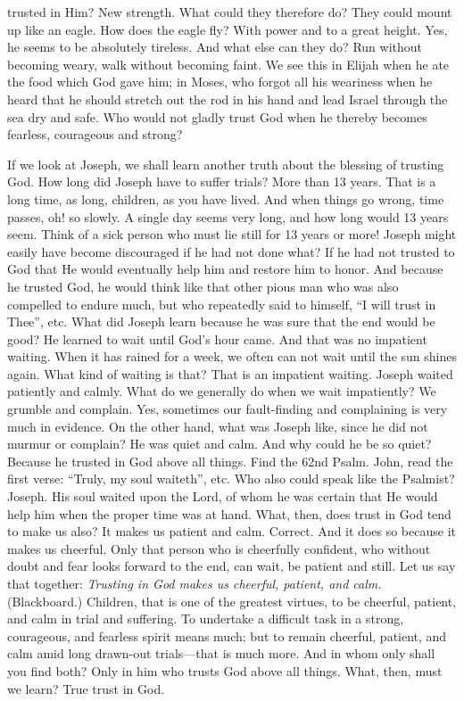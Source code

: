 trusted in Him? New strength. What could they therefore do? They could mount up like an eagle. How does the eagle fly? With power and to a great height. Yes, he seems to be absolutely tireless. And what else can they do? Run without becoming weary, walk without becoming
faint. We see this in Elijah when he ate the food which God gave him; in Moses, who forgot all his weariness when he heard that he should stretch out the rod in his hand and lead Israel through the sea dry and safe. Who would not gladly trust God when he thereby becomes fearless, courageous and strong?

If we look at Joseph, we shall learn another truth about the blessing of trusting God. How long did Joseph have to suffer trials? More than 13 years. That is a long time, as long, children, as you have lived. And when things go wrong, time passes, oh! so slowly. A single day seems very long, and how long would 13 years seem. Think of a sick person who must lie still for 13 years or more! Joseph might easily have become discouraged if he had not done what? If he had not trusted to God that He would eventually help him and restore him to honor. And because he trusted God, he would think like that other pious man who was also compelled to endure much, but who repeatedly said to himself, “I will trust in Thee”, etc. What did Joseph learn because he was sure that the end would be good? He learned to wait until God’s hour came. And that was no impatient waiting. When it has rained for a week, we often can not wait until the sun shines again. What kind of waiting is that? That is an impatient waiting. Joseph waited patiently and calmly. What do we generally do when we wait impatiently? We grumble and complain. Yes, sometimes our fault-finding and complaining is very much in evidence. On the other hand, what was Joseph like, since he did not murmur or complain? He was quiet and calm. And why could he be so quiet? Because he trusted in God above all things. Find the 62nd Psalm. John, read the first verse: “Truly, my soul waiteth”, etc. Who also could speak like the Psalmist? Joseph. His soul waited upon the Lord, of whom he was certain that He would help him when the proper time was at hand. What, then, does trust in God tend to make us also? It makes us patient and calm. Correct. And it does so because it makes us cheerful. Only that person who is cheerfully confident, who without doubt and fear looks forward to the end, can wait, be patient and still. Let us say that together: \emph{Trusting in God makes us cheerful, patient, and calm.} (Blackboard.) Children, that is one of the greatest virtues, to be cheerful, patient, and calm in trial and suffering. To undertake a difficult task in a strong, courageous, and fearless spirit means much; but to remain cheerful, patient, and calm amid long drawn-out trials—that is much more. And in whom only shall you find both? Only in him who trusts God above all things. What, then, must we learn? True trust in God.

